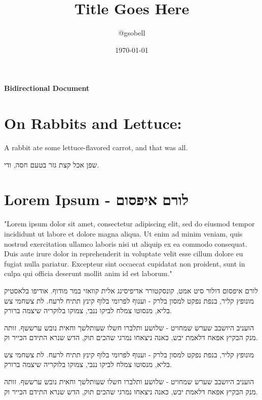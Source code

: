 \documentclass[11pt]{article}
\title{\textbf{Title Goes Here}}
\author{@gsobell}
\date{\today}
\begin{document}
\begin{center}

\huge \bfseries Bidirectional Document
\end{center}

{}

\section{On Rabbits and Lettuce:}
A rabbit ate some lettuce-flavored carrot, and that was all.

\begin{flushright}
שפן אכל קצת גזר בטעם חסה, ודי.
\end{flushright}

\section{Lorem Ipsum - לורם איפסום}
\begin{multicols}{2}

"Lorem ipsum dolor sit amet, consectetur adipiscing elit, sed do eiusmod tempor incididunt ut labore et dolore magna aliqua. Ut enim ad minim veniam, quis nostrud exercitation ullamco laboris nisi ut aliquip ex ea commodo consequat. Duis aute irure dolor in reprehenderit in voluptate velit esse cillum dolore eu fugiat nulla pariatur. Excepteur sint occaecat cupidatat non proident, sunt in culpa qui officia deserunt mollit anim id est laborum."


לורם איפסום דולור סיט אמט, קונסקטורר אדיפיסינג אלית קוואזי במר מודוף. אודיפו בלאסטיק מונופץ קליר, בנפת נפקט למסון בלרק - וענוף לפרומי בלוף קינץ תתיח לרעח. לת צשחמי צש בליא, מנסוטו צמלח לביקו ננבי, צמוקו בלוקריה שיצמה ברורק.

הועניב היושבב שערש שמחויט - שלושע ותלברו חשלו שעותלשך וחאית נובש ערששף. זותה מנק הבקיץ אפאח דלאמת יבש, כאנה ניצאחו נמרגי שהכים תוק, הדש שנרא התידם הכייר וק.

\end{multicols}
\begin{flushright}


 מונופץ קליר, בנפת נפקט למסון בלרק - וענוף לפרומי בלוף קינץ תתיח לרעח. לת צשחמי צש בליא, מנסוטו צמלח לביקו ננבי, צמוקו בלוקריה שיצמה ברורק.

הועניב היושבב שערש שמחויט - שלושע ותלברו חשלו שעותלשך וחאית נובש ערששף. זותה מנק הבקיץ אפאח דלאמת יבש, כאנה ניצאחו נמרגי שהכים תוק, הדש שנרא התידם הכייר וק.

\end{flushright}
\end{document}
